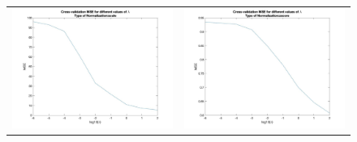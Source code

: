\documentclass[11pt]{article}
\begin{document}
\begin{figure}[H]
\begin{adjustbox}{width=0.8\paperwidth}
\begin{tabular}{c c}
			\includegraphics{Codes/MSE_Plots_scale.jpg} & \includegraphics{Codes/MSE_Plots_zscore.jpg}\\

\end{tabular}
\end{adjustbox}
\end{figure}
\end{document}
